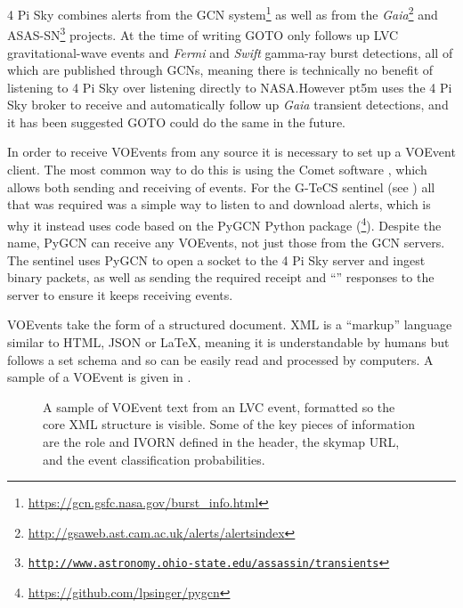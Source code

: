 \begin{colsection}
\newpage

4 Pi Sky combines alerts from the GCN system\footnote{\url{https://gcn.gsfc.nasa.gov/burst_info.html}} as well as from the \textit{Gaia}\footnote{\url{http://gsaweb.ast.cam.ac.uk/alerts/alertsindex}} and ASAS-SN\footnote{\href{http://www.astronomy.ohio-state.edu/~assassin/transients}{\texttt{http://www.astronomy.ohio-state.edu/\raisebox{0.5ex}{\texttildelow}assassin/transients}}} projects. At the time of writing GOTO only follows up LVC gravitational-wave events and \textit{Fermi} and \textit{Swift} gamma-ray burst detections, all of which are published through GCNs, meaning there is technically no benefit of listening to 4 Pi Sky over listening directly to NASA.\@ However pt5m uses the 4 Pi Sky broker to receive and automatically follow up \textit{Gaia} transient detections, and it has been suggested GOTO could do the same in the future.

In order to receive VOEvents from any source it is necessary to set up a VOEvent client. The most common way to do this is using the Comet software \citep{comet}, which allows both sending and receiving of events. For the G-TeCS sentinel (see ) all that was required was a simple way to listen to and download alerts, which is why it instead uses code based on the PyGCN Python package (\footnote{\url{https://github.com/lpsinger/pygcn}}). Despite the name, PyGCN can receive any VOEvents, not just those from the GCN servers. The sentinel uses PyGCN to open a socket to the 4 Pi Sky server and ingest binary packets, as well as sending the required receipt and ``'' responses to the server to ensure it keeps receiving events.

VOEvents take the form of a structured  document. XML is a ``markup'' language similar to HTML, JSON or \LaTeX, meaning it is understandable by humans but follows a set schema and so can be easily read and processed by computers. A sample of a VOEvent is given in .

\begin{figure}[p]
    
    \caption[VOEvent XML sample]{
        A sample of VOEvent text from an LVC event, formatted so the core XML structure is visible. Some of the key pieces of information are the role and IVORN defined in the header, the skymap URL, and the event classification probabilities.
    }\label{fig:voevent_xml}
\end{figure}

\newpage

\end{colsection}

